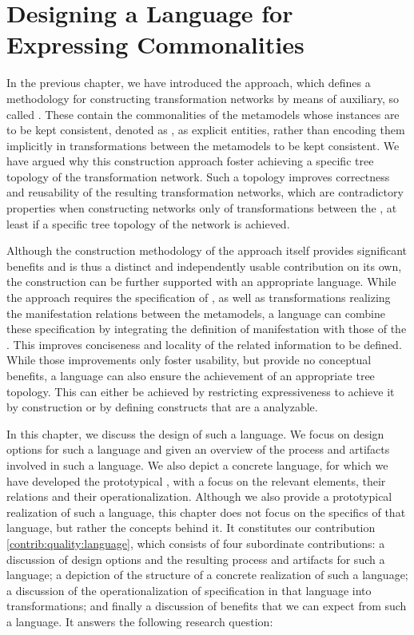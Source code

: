 \chapter{Designing a Language for Expressing Commonalities 
}
\label{chap:language}

In the previous chapter, we have introduced the \commonalities approach, which defines a methodology for constructing transformation networks by means of auxiliary, so called \conceptmetamodels.
These \conceptmetamodels contain the commonalities of the metamodels whose instances are to be kept consistent, denoted as \concretemetamodels, as explicit entities, rather than encoding them implicitly in transformations between the metamodels to be kept consistent.
We have argued why this construction approach foster achieving a specific tree topology of the transformation network.
Such a topology improves correctness and reusability of the resulting transformation networks, which are contradictory properties when constructing networks only of transformations between the \concretemetamodels, at least if a specific tree topology of the network is achieved.

Although the construction methodology of the \commonalities approach itself provides significant benefits and is thus a distinct and independently usable contribution on its own, the construction can be further supported with an appropriate language.
While the approach requires the specification of \conceptmetamodels, as well as transformations realizing the manifestation relations between the metamodels, a language can combine these specification by integrating the definition of manifestation with those of the \commonalities.
This improves conciseness and locality of the related information to be defined.
While those improvements only foster usability, but provide no conceptual benefits, a language can also ensure the achievement of an appropriate tree topology.
This can either be achieved by restricting expressiveness to achieve it by construction or by defining constructs that are a analyzable.

In this chapter, we discuss the design of such a language.
We focus on design options for such a language and given an overview of the process and artifacts involved in such a language.
We also depict a concrete language, for which we have developed the prototypical \commonalitieslanguage, with a focus on the relevant elements, their relations and their operationalization.
Although we also provide a prototypical realization of such a language, this chapter does not focus on the specifics of that language, but rather the concepts behind it.
It constitutes our contribution \autoref{contrib:quality:language}, which consists of four subordinate contributions: a discussion of design options and the resulting process and artifacts for such a language; a depiction of the structure of a concrete realization of such a language; a discussion of the operationalization of specification in that language into transformations; and finally a discussion of benefits that we can expect from such a language.
It answers the following research question:

